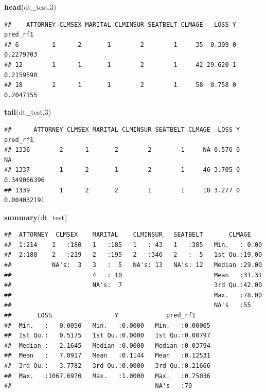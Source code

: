 \documentclass[]{book}
\newenvironment{Shaded}{\begin{snugshade}}{\end{snugshade}}
\newcommand{\DecValTok}[1]{\textcolor[rgb]{0.00,0.00,0.81}{#1}}
\newcommand{\KeywordTok}[1]{\textcolor[rgb]{0.13,0.29,0.53}{\textbf{#1}}}
\newcommand{\NormalTok}[1]{#1}
\begin{document}
\begin{Shaded}
\begin{Highlighting}[]
\KeywordTok{head}\NormalTok{(dt_test,}\DecValTok{3}\NormalTok{)}
\end{Highlighting}
\end{Shaded}

\begin{verbatim}
##    ATTORNEY CLMSEX MARITAL CLMINSUR SEATBELT CLMAGE   LOSS Y  pred_rf1
## 6         1      2       1        2        1     35  0.309 0 0.2279703
## 12        1      1       1        2        1     42 29.620 1 0.2159590
## 18        1      1       1        2        1     58  0.758 0 0.2047155
\end{verbatim}

\begin{Shaded}
\begin{Highlighting}[]
\KeywordTok{tail}\NormalTok{(dt_test,}\DecValTok{3}\NormalTok{)}
\end{Highlighting}
\end{Shaded}

\begin{verbatim}
##      ATTORNEY CLMSEX MARITAL CLMINSUR SEATBELT CLMAGE  LOSS Y    pred_rf1
## 1336        2      1       2        2        1     NA 0.576 0          NA
## 1337        1      2       1        2        1     46 3.705 0 0.349066396
## 1339        1      2       2        1        1     18 3.277 0 0.004032191
\end{verbatim}

\begin{Shaded}
\begin{Highlighting}[]
\KeywordTok{summary}\NormalTok{(dt_test)}
\end{Highlighting}
\end{Shaded}

\begin{verbatim}
##  ATTORNEY  CLMSEX    MARITAL    CLMINSUR   SEATBELT       CLMAGE     
##  1:214    1   :180   1   :185   1   : 43   1   :385   Min.   : 0.00  
##  2:188    2   :219   2   :195   2   :346   2   :  5   1st Qu.:19.00  
##           NA's:  3   3   :  5   NA's: 13   NA's: 12   Median :29.00  
##                      4   : 10                         Mean   :31.31  
##                      NA's:  7                         3rd Qu.:42.00  
##                                                       Max.   :78.00  
##                                                       NA's   :55     
##       LOSS                 Y             pred_rf1      
##  Min.   :   0.0050   Min.   :0.0000   Min.   :0.00005  
##  1st Qu.:   0.5175   1st Qu.:0.0000   1st Qu.:0.00797  
##  Median :   2.1645   Median :0.0000   Median :0.03794  
##  Mean   :   7.0917   Mean   :0.1144   Mean   :0.12531  
##  3rd Qu.:   3.7782   3rd Qu.:0.0000   3rd Qu.:0.21666  
##  Max.   :1067.6970   Max.   :1.0000   Max.   :0.75036  
##                                       NA's   :70
\end{verbatim}
\end{document}
